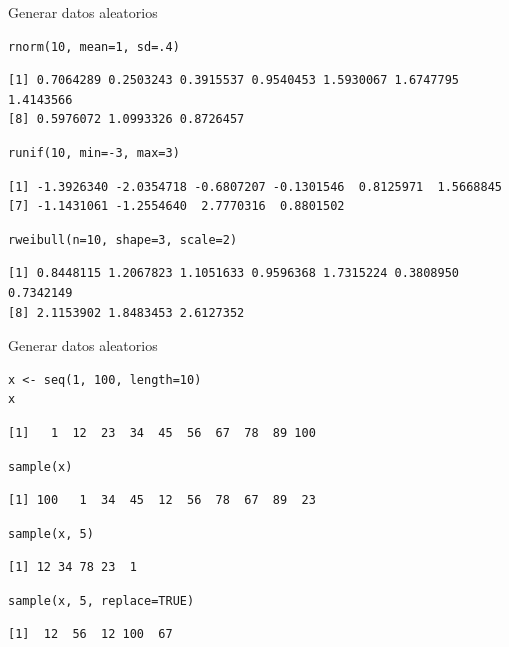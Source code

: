 \documentclass[xcolor={usenames,svgnames,dvipsnames}]{beamer}
\begin{document}
\begin{frame}[fragile,label=sec-2-3]{Generar datos aleatorios}
 \lstset{language=R,numbers=none}
\begin{lstlisting}
rnorm(10, mean=1, sd=.4)
\end{lstlisting}

\begin{verbatim}
[1] 0.7064289 0.2503243 0.3915537 0.9540453 1.5930067 1.6747795 1.4143566
[8] 0.5976072 1.0993326 0.8726457
\end{verbatim}

\lstset{language=R,numbers=none}
\begin{lstlisting}
runif(10, min=-3, max=3)
\end{lstlisting}

\begin{verbatim}
[1] -1.3926340 -2.0354718 -0.6807207 -0.1301546  0.8125971  1.5668845
[7] -1.1431061 -1.2554640  2.7770316  0.8801502
\end{verbatim}

\lstset{language=R,numbers=none}
\begin{lstlisting}
rweibull(n=10, shape=3, scale=2)
\end{lstlisting}

\begin{verbatim}
[1] 0.8448115 1.2067823 1.1051633 0.9596368 1.7315224 0.3808950 0.7342149
[8] 2.1153902 1.8483453 2.6127352
\end{verbatim}
\end{frame}
\begin{frame}[fragile,label=sec-2-4]{Generar datos aleatorios}
 \lstset{language=R,numbers=none}
\begin{lstlisting}
x <- seq(1, 100, length=10)
x
\end{lstlisting}

\begin{verbatim}
[1]   1  12  23  34  45  56  67  78  89 100
\end{verbatim}

\lstset{language=R,numbers=none}
\begin{lstlisting}
sample(x)
\end{lstlisting}

\begin{verbatim}
[1] 100   1  34  45  12  56  78  67  89  23
\end{verbatim}

\lstset{language=R,numbers=none}
\begin{lstlisting}
sample(x, 5)
\end{lstlisting}

\begin{verbatim}
[1] 12 34 78 23  1
\end{verbatim}

\lstset{language=R,numbers=none}
\begin{lstlisting}
sample(x, 5, replace=TRUE)
\end{lstlisting}

\begin{verbatim}
[1]  12  56  12 100  67
\end{verbatim}
\end{frame}
\end{document}
